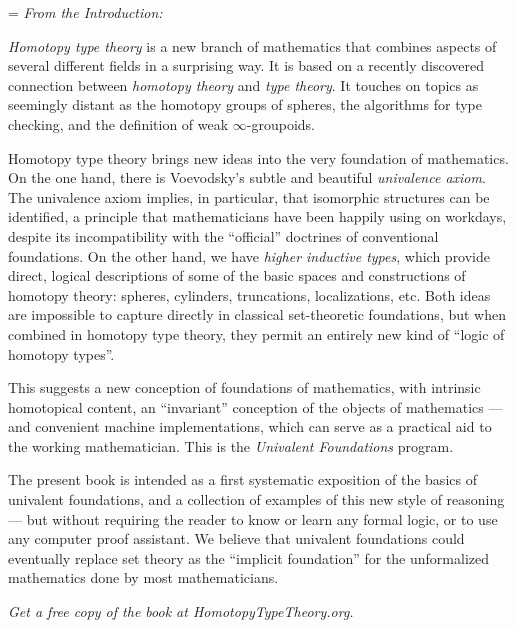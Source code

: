 
{\raggedright
\parindent=0pt
\parskip=\baselineskip
{\OPTbacktitlefont
\textit{From the Introduction:}}
\OPTbackfont

\emph{Homotopy type theory} is a new branch of mathematics that combines aspects of several different fields in a surprising way. It is based on a recently discovered connection between \emph{homotopy theory} and \emph{type theory}.
It touches on topics as seemingly distant as the homotopy groups of spheres, the algorithms for type checking, and the definition of weak $\infty$-groupoids.

Homotopy type theory brings new ideas into the very foundation of mathematics.
On the one hand, there is Voevodsky's subtle and beautiful \emph{univalence axiom}.
The univalence axiom implies, in particular, that isomorphic structures can be identified, a principle that mathematicians have been happily using on workdays, despite its incompatibility with the ``official'' doctrines of conventional foundations.
On the other hand, we have \emph{higher inductive types}, which provide direct, logical descriptions of some of the basic spaces and constructions of homotopy theory: spheres, cylinders, truncations, localizations, etc.
Both ideas are impossible to capture directly in classical set-theoretic foundations, but when combined in homotopy type theory, they permit an entirely new kind of ``logic of homotopy types''.

This suggests a new conception of foundations of mathematics, with intrinsic homotopical content, an ``invariant'' conception of the objects of mathematics --- and convenient machine implementations, which can serve as a practical aid to the working mathematician.
This is the \emph{Univalent Foundations} program.

The present book is intended as a first systematic exposition of the basics of univalent foundations, and a collection of examples of this new style of reasoning --- but without requiring the reader to know or learn any formal logic, or to use any computer proof assistant.
We believe that univalent foundations could eventually replace set theory as the ``implicit foundation'' for the unformalized mathematics done by most mathematicians.

\bigskip

\begin{center}
  {\Large
  \textit{Get a free copy of the book at HomotopyTypeTheory.org.}}
\end{center}
}
